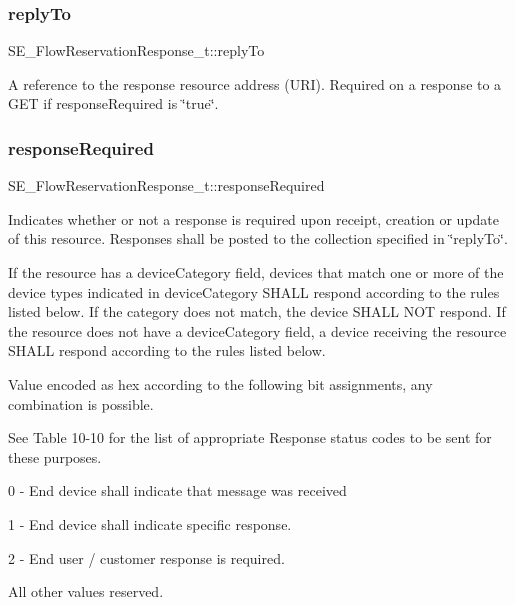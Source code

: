 \subsubsection{\texorpdfstring{reply\+To}{replyTo}}
{\footnotesize\ttfamily S\+E\+\_\+\+Flow\+Reservation\+Response\+\_\+t\+::reply\+To}

A reference to the response resource address (U\+RI). Required on a response to a G\+ET if response\+Required is \char`\"{}true\char`\"{}. \mbox{\label{group__FlowReservationResponse_gab718a8c77c27f3cef17dc8815a015901}} 
\subsubsection{\texorpdfstring{response\+Required}{responseRequired}}
{\footnotesize\ttfamily S\+E\+\_\+\+Flow\+Reservation\+Response\+\_\+t\+::response\+Required}

Indicates whether or not a response is required upon receipt, creation or update of this resource. Responses shall be posted to the collection specified in \char`\"{}reply\+To\char`\"{}.

If the resource has a device\+Category field, devices that match one or more of the device types indicated in device\+Category S\+H\+A\+LL respond according to the rules listed below. If the category does not match, the device S\+H\+A\+LL N\+OT respond. If the resource does not have a device\+Category field, a device receiving the resource S\+H\+A\+LL respond according to the rules listed below.

Value encoded as hex according to the following bit assignments, any combination is possible.

See Table 10-\/10 for the list of appropriate Response status codes to be sent for these purposes.

0 -\/ End device shall indicate that message was received

1 -\/ End device shall indicate specific response.

2 -\/ End user / customer response is required.

All other values reserved. \mbox{\label{group__FlowReservationResponse_gabbd0fa2ff3f086063ddf07aa555b0183}} 
